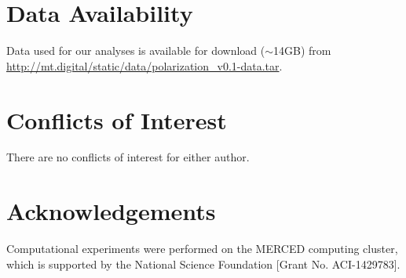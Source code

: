 
% 
\section*{Data Availability}
Data used for our analyses is available for download ($\sim$14GB) from 
\url{http://mt.digital/static/data/polarization_v0.1-data.tar}. 

\section*{Conflicts of Interest}
There are no conflicts of interest for either author.

\section*{Acknowledgements}
Computational experiments were performed on the MERCED computing cluster,
which is supported by the National Science Foundation [Grant No. ACI-1429783].


\clearpage


